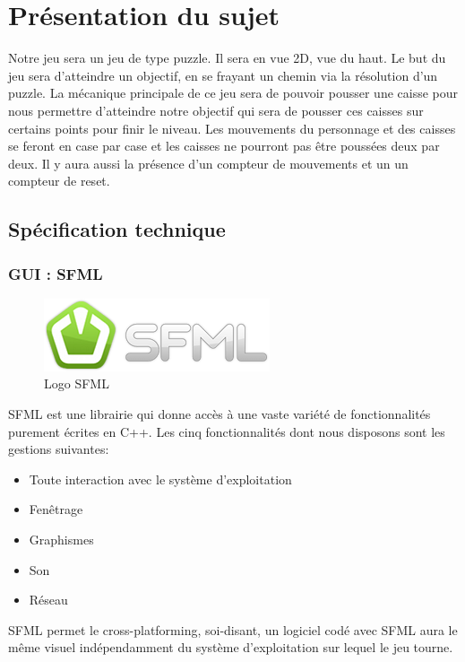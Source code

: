 \section{Présentation du sujet}
Notre jeu sera un jeu de type puzzle. Il sera en vue 2D, vue du haut. Le but du jeu sera d’atteindre un objectif, en se frayant un chemin via la résolution d’un puzzle. 
La mécanique principale de ce jeu sera de pouvoir pousser une caisse pour nous permettre d’atteindre notre objectif qui sera de pousser ces caisses sur certains points pour finir le niveau. 
Les mouvements du personnage et des caisses se feront en case par case et les caisses ne pourront pas être poussées deux par deux. Il y aura aussi la présence d’un compteur de mouvements et  un 
un compteur de reset.

\subsection{Spécification technique}
\subsubsection{GUI : SFML}
\begin{figure}[h]
	\centering
	\includegraphics{pictures/SFML_logo.png}
	\caption{Logo SFML}
	\label{fig:logo_sfml}
\end{figure}
SFML est une librairie qui donne accès à une vaste variété de fonctionnalités purement écrites en C++. Les cinq fonctionnalités dont nous disposons sont les gestions suivantes:
\begin{itemize}
	\item Toute interaction avec le système d'exploitation
	\item Fenêtrage
	\item Graphismes
	\item Son
	\item Réseau
\end{itemize}

SFML permet le cross-platforming, soi-disant, un logiciel codé avec SFML aura le même visuel indépendamment du système d'exploitation sur lequel le jeu tourne.

